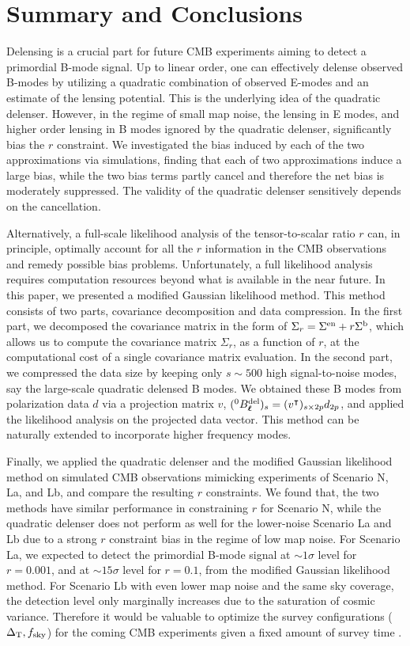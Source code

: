 \documentclass[aps, prd, reprint, nofootinbib, groupedaddress, showpacs]{revtex4-1}
\newcommand*\Bell{\ensuremath{\boldsymbol\ell}}
\begin{document}
\section{Summary and Conclusions}
\label{sec:summary}

Delensing is a crucial part for future CMB experiments aiming to detect a primordial B-mode signal.
Up to linear order, one can effectively delense observed B-modes by utilizing
a quadratic combination of observed E-modes and an estimate of the lensing potential.
This is the underlying idea of the quadratic delenser.
However, in the regime of small map noise,
the lensing in E modes, and higher order lensing in B modes
ignored by the quadratic delenser, significantly bias the $r$ constraint.
We investigated the bias induced by each of the two approximations via simulations,
finding that each of two approximations induce a large bias, while the two bias terms
partly cancel and therefore the net bias is moderately suppressed.
The validity of the quadratic delenser sensitively depends on the cancellation.

Alternatively,  a full-scale likelihood analysis of the tensor-to-scalar ratio $r$ can,
in principle, optimally account for all the $r$ information in the CMB observations and
remedy possible bias problems.
Unfortunately, a full likelihood analysis requires computation resources beyond
what is available in the near future.
In this paper, we presented a modified Gaussian likelihood method.
This method consists of two parts, covariance decomposition and data compression.
In the first part, we decomposed the covariance matrix
in the form of $\Sigma_r = \Sigma^{\rm en} + r \Sigma^{\rm b}$,
which allows us to compute the covariance matrix $\Sigma_r$, as a function of $r$, at the computational cost
of a single covariance matrix evaluation.
In the second part, we compressed the data size by keeping only $s\sim 500$
high signal-to-noise modes, say the large-scale quadratic delensed B modes.
We obtained these B modes from polarization data $d$ via a projection matrix $v$,
$(^0B^{\rm del}_{\Bell})_s = (v^\intercal)_{s\times 2p} d_{2p}$,
and applied the likelihood analysis on the projected data vector.
This method can be naturally extended to incorporate higher frequency modes.

Finally, we applied the quadratic delenser and
the modified Gaussian likelihood method on simulated CMB observations mimicking experiments of
Scenario N, La, and Lb, and compare the resulting $r$ constraints.
We found that, the two methods have similar performance in constraining $r$
for Scenario N, while the quadratic delenser does not perform
as well for the lower-noise Scenario La and Lb due to a strong $r$ constraint bias
in the regime of low map noise. For Scenario La, we expected to detect the
primordial B-mode signal at $\sim 1 \sigma$ level for $r=0.001$, and at $\sim 15 \sigma$ level for $r=0.1$,
from the modified Gaussian likelihood method.
For Scenario Lb with even lower map noise and the same sky coverage,
the detection level only marginally increases due to the saturation of cosmic variance.
Therefore it would be valuable to optimize the survey configurations (${\Delta_{\rm T}, f_{\rm sky}}$)
for the coming CMB experiments given a fixed amount of survey time \citep{s42016}.
\end{document}

